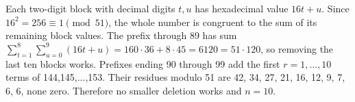 Each two-digit block with decimal digits $t,u$ has hexadecimal value $16t+u$. Since $16^2=256\equiv1\pmod{51}$, the whole number is congruent to the sum of its remaining block values. The prefix through 89 has sum $\sum_{t=1}^{8}\sum_{u=0}^{9}(16t+u)=160\cdot36+8\cdot45=6120=51\cdot120$, so removing the last ten blocks works. Prefixes ending 90 through 99 add the first $r=1,\ldots,10$ terms of 144,145,...,153. Their residues modulo 51 are 42, 34, 27, 21, 16, 12, 9, 7, 6, 6, none zero. Therefore no smaller deletion works and $\boxed{n=10}$.
